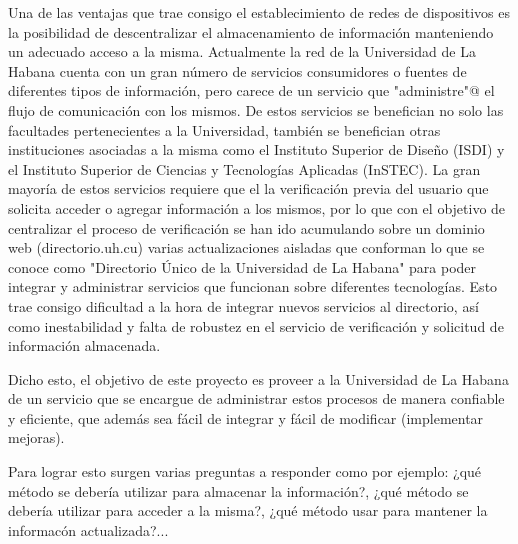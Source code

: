 \begin{introduction}
Una de las ventajas que trae consigo el establecimiento de redes de dispositivos es
la posibilidad de descentralizar el almacenamiento de información  manteniendo un adecuado acceso a la misma. Actualmente la red de la Universidad de La Habana cuenta con un gran número de servicios consumidores o fuentes de diferentes tipos de información, pero carece de un servicio que \verb@"administre"@ el flujo de comunicación con los mismos. De estos servicios se benefician no solo las facultades pertenecientes a la Universidad, también se benefician otras instituciones asociadas a la misma como  el Instituto Superior de Diseño (ISDI) y el Instituto Superior de Ciencias y Tecnologías Aplicadas (InSTEC). La gran mayoría  de estos servicios requiere que el la verificación previa del usuario que solicita acceder o  agregar información a los mismos, por lo que con el objetivo de centralizar el proceso de verificación se han ido acumulando sobre un dominio web (directorio.uh.cu) varias actualizaciones  aisladas que conforman lo que se conoce como "Directorio Único de la Universidad de La Habana" para poder integrar y administrar servicios que funcionan sobre diferentes tecnologías.  Esto  trae consigo dificultad a la hora de integrar nuevos servicios al directorio, así como inestabilidad y falta de robustez en el servicio de verificación y solicitud de información almacenada.


Dicho esto, el objetivo de este proyecto es proveer a la Universidad de La Habana de un
servicio que se encargue de administrar estos procesos de manera confiable y eficiente,
que además sea fácil de integrar y fácil de modificar (implementar mejoras).

Para lograr esto surgen varias preguntas a responder como por ejemplo: ¿qué método 
se debería utilizar para almacenar la información?, ¿qué método se debería utilizar 
para acceder a la misma?, ¿qué método usar para mantener la informacón actualizada?... 


\end{introduction}
